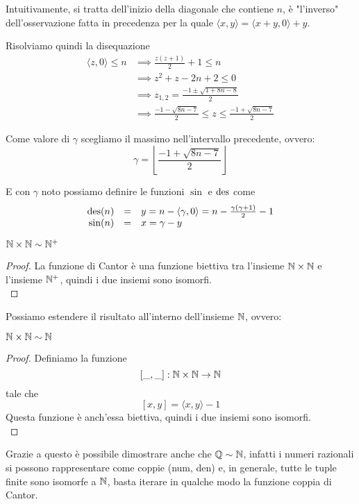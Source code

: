Intuitivamente, si tratta dell'inizio della diagonale che contiene $n$, è "l'inverso" dell'osservazione fatta in precedenza per la quale $ \langle x,y \rangle = \langle x + y,0 \rangle + y $.

Risolviamo quindi la disequazione
\begin{align*}
	\langle z, 0 \rangle \leq n & \implies \frac{z(z+1)}{2} + 1 \leq n \\
	& \implies z^2 + z - 2n + 2 \leq 0 \\
	& \implies z_{1,2} = \frac{-1 \pm \sqrt{1 + 8n - 8}}{2} \\
	& \implies \frac{-1 - \sqrt{8n - 7}}{2} \leq z \leq \frac{-1 + \sqrt{8n - 7}}{2} 
\end{align*}

Come valore di $\gamma$ scegliamo il massimo nell'intervallo precedente, ovvero:
$$ \gamma = \left\lfloor \frac{-1 + \sqrt{8n - 7}}{2} \right\rfloor $$

E con $\gamma$ noto possiamo definire le funzioni $\sin$ e $\operatorname{des}$ come
$$ 
\begin{array}{r c l}
	\operatorname{des}(n) & = & y = n - \langle \gamma, 0 \rangle = n - \frac{\gamma (\gamma + 1)}{2} - 1 \\
	\sin (n) & = & x = \gamma - y
\end{array}
$$

\begin{theor}
	$\mathbb{N} \times \mathbb{N} \sim \mathbb{N}^+$
\end{theor}
\begin{proof}
	La funzione di Cantor è una funzione biettiva tra l'insieme $\mathbb{N} \times \mathbb{N}$ e l'insieme $\mathbb{N}^+$, quindi i due insiemi sono isomorfi. \\
\end{proof}

Possiamo estendere il risultato all'interno dell'insieme $\mathbb{N}$, ovvero:

\begin{theor}
	$\mathbb{N} \times \mathbb{N} \sim \mathbb{N}$
\end{theor}
\begin{proof}
	Definiamo la funzione 
	$$ [\_ , \_]: \mathbb{N} \times \mathbb{N} \rightarrow \mathbb{N} $$
	tale che
	$$ [x,y] = \langle x,y \rangle - 1$$
	Questa funzione è anch'essa biettiva, quindi i due insiemi sono isomorfi. \\
\end{proof}

Grazie a questo è possibile dimostrare anche che $\mathbb{Q} \sim \mathbb{N}$, infatti i numeri razionali si possono rappresentare come coppie (num, den) e, in generale, tutte le tuple finite sono isomorfe a $\mathbb{N}$, basta iterare in qualche modo la funzione coppia di Cantor.

